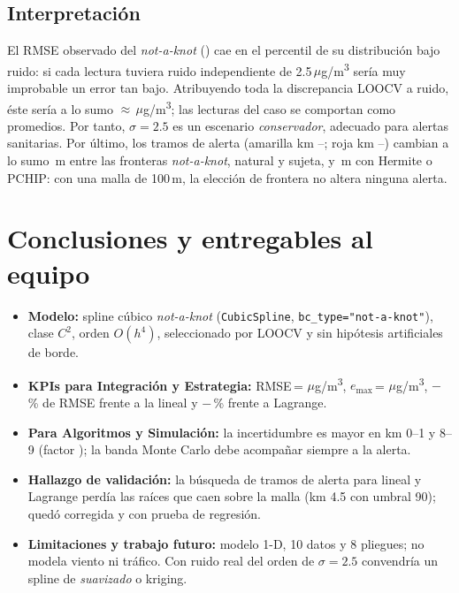 \documentclass[conference,a4paper]{IEEEtran}
\newcommand{\ugm}{\ensuremath{\mu}g/m\textsuperscript{3}}
\newcommand{\nak}{\emph{not-a-knot}}
\begin{document}
\subsection{Interpretación}
El RMSE observado del \nak{} (\RMSEnak) cae en el percentil \PCTnak{} de su distribución bajo ruido: si
cada lectura tuviera ruido independiente de 2.5\,\ugm{} sería muy improbable un error tan bajo. Atribuyendo
toda la discrepancia LOOCV a ruido, éste sería a lo sumo $\approx$\SIGef\,\ugm{}; las lecturas del caso se
comportan como promedios. Por tanto, $\sigma=2.5$ es un escenario \emph{conservador}, adecuado para alertas
sanitarias. Por último, los tramos de alerta (amarilla km \AMdesde--\AMhasta; roja km \ROdesde--\ROhasta)
cambian a lo sumo \DESFASEsplines\,m entre las fronteras \nak, natural y sujeta, y \DESFASEherPch\,m con
Hermite o PCHIP: con una malla de 100\,m, la elección de frontera no altera ninguna alerta.

\section{Conclusiones y entregables al equipo}
\begin{itemize}
\item \textbf{Modelo:} spline cúbico \nak{} (\texttt{CubicSpline}, \texttt{bc\_type="not-a-knot"}), clase
$C^2$, orden $O(h^4)$, seleccionado por LOOCV y sin hipótesis artificiales de borde.
\item \textbf{KPIs para Integración y Estrategia:} RMSE\,=\,\RMSEnak\,\ugm, $e_{\max}$\,=\,\EMAXnak\,\ugm,
$-$\REDlin\,\% de RMSE frente a la lineal y $-$\REDlag\,\% frente a Lagrange.
\item \textbf{Para Algoritmos y Simulación:} la incertidumbre es mayor en km 0--1 y 8--9 (factor
\FACnakBorde); la banda Monte Carlo debe acompañar siempre a la alerta.
\item \textbf{Hallazgo de validación:} la búsqueda de tramos de alerta para lineal y Lagrange perdía las
raíces que caen sobre la malla (km 4.5 con umbral 90); quedó corregida y con prueba de regresión.
\item \textbf{Limitaciones y trabajo futuro:} modelo 1-D, 10 datos y 8 pliegues; no modela viento ni
tráfico. Con ruido real del orden de $\sigma=2.5$ convendría un spline de \emph{suavizado} o kriging.
\end{itemize}
\end{document}
